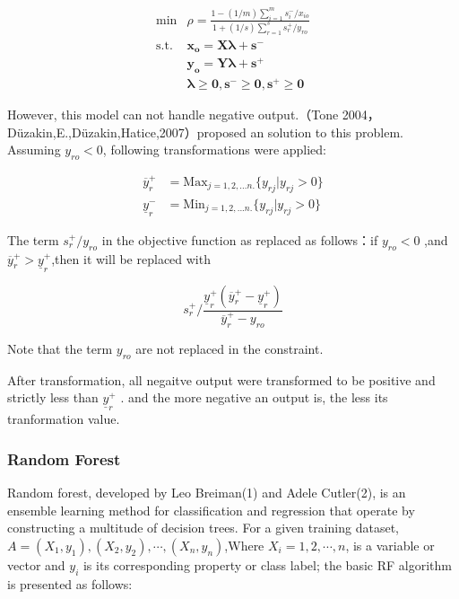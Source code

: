 \documentclass[]{article}
\begin{document}
\[
    \begin{aligned}
    \min & \rho=\frac{1-(1/m)\sum_{i=1}^{m}s_{i}^{-}/x_{io}}{1+(1/s)\sum_{r=1}^{s}s_{r}^{+}/y_{ro}}\\
    \textrm{s.t.} & \mathbf{x_{o}}=\mathbf{X\lambda}+\mathbf{s^{-}}\\
     & \mathbf{y_{o}}=\mathbf{Y\lambda}+\mathbf{s^{+}}\\
     & \mathbf{\lambda}\geq\mathbf{0},\mathbf{s^{-}}\geq\mathbf{0},\mathbf{s^{+}}\geq\mathbf{0}
    \end{aligned}
\]

However, this model can not handle negative output.（Tone
2004，Düzakin,E.,Düzakin,Hatice,2007）proposed an solution to this
problem. Assuming $y_{ro}<0$, following transformations were applied:

\[
\begin{aligned}
\overline{y}_{r}^{+} & =\textrm{Max}_{j=1,2,...n.}\{y_{rj}|y_{rj}>0\}\\
\underline{y}_{r}^{-} & =\textrm{Min}_{j=1,2,...n.}\{y_{rj}|y_{rj}>0\}
\end{aligned}
\]

The term $s_r^+/y_{ro}$ in the objective function as replaced as
follows：if $y_{ro}<0$ ,and
$\overline{y}_{r}^{+}>\underline{y}_{r}^{+}$,then it will be replaced
with

\[
s_r^{+}/\frac{\underline{y}_{r}^{+}(\overline{y}_{r}^{+}-\underline{y}_{r}^{+})}{\overline{y}_{r}^{+}-y_{ro}}
\]

Note that the term $y_{ro}$ are not replaced in the constraint.

After transformation, all negaitve output were transformed to be
positive and strictly less than $\underline{y}_{r}^{+}$ . and the more
negative an output is, the less its tranformation value.

\subsubsection{Random Forest}\label{random-forest}

Random forest, developed by Leo Breiman(1) and Adele Cutler(2), is an
ensemble learning method for classification and regression that operate
by constructing a multitude of decision trees. For a given training
dataset, $A = {(X_1,y_1),(X_2,y_2),\cdots,(X_n,y_n)}$,Where
$X_i = 1,2,\cdots,n$, is a variable or vector and $y_i$ is its
corresponding property or class label; the basic RF algorithm is
presented as follows:
\end{document}
